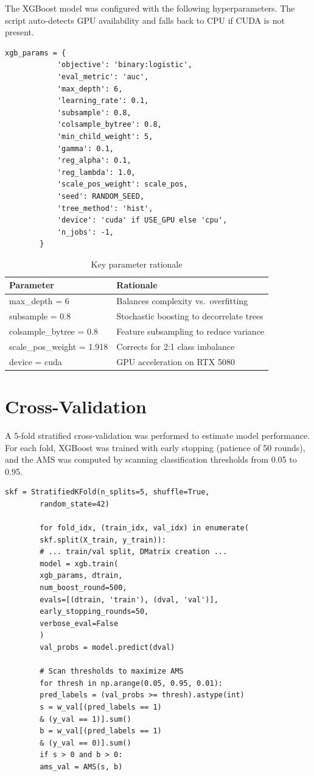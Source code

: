 \documentclass[12pt]{article}
\begin{document}
	The XGBoost model was configured with the following hyperparameters. The script auto-detects GPU availability and falls back to CPU if CUDA is not present.
	
	\begin{lstlisting}[caption={XGBoost hyperparameter configuration with GPU detection}]
		xgb_params = {
			'objective': 'binary:logistic',
			'eval_metric': 'auc',
			'max_depth': 6,
			'learning_rate': 0.1,
			'subsample': 0.8,
			'colsample_bytree': 0.8,
			'min_child_weight': 5,
			'gamma': 0.1,
			'reg_alpha': 0.1,
			'reg_lambda': 1.0,
			'scale_pos_weight': scale_pos,
			'seed': RANDOM_SEED,
			'tree_method': 'hist',
			'device': 'cuda' if USE_GPU else 'cpu',
			'n_jobs': -1,
		}
	\end{lstlisting}
	
	\begin{table}[H]
		\centering
		\begin{tabular}{ll}
			\toprule
			\textbf{Parameter} & \textbf{Rationale} \\
			\midrule
			max\_depth = 6 & Balances complexity vs.\ overfitting \\
			subsample = 0.8 & Stochastic boosting to decorrelate trees \\
			colsample\_bytree = 0.8 & Feature subsampling to reduce variance \\
			scale\_pos\_weight = 1.918 & Corrects for 2:1 class imbalance \\
			device = cuda & GPU acceleration on RTX 5080 \\
			\bottomrule
		\end{tabular}
		\caption{Key parameter rationale}
	\end{table}
	
	\newpage
	\section*{Cross-Validation}
	
	A 5-fold stratified cross-validation was performed to estimate model performance. For each fold, XGBoost was trained with early stopping (patience of 50 rounds), and the AMS was computed by scanning classification thresholds from 0.05 to 0.95.
	
	\begin{lstlisting}[caption={Cross-validation loop with AMS threshold scanning}]
		skf = StratifiedKFold(n_splits=5, shuffle=True, 
		random_state=42)
		
		for fold_idx, (train_idx, val_idx) in enumerate(
		skf.split(X_train, y_train)):
		# ... train/val split, DMatrix creation ...
		model = xgb.train(
		xgb_params, dtrain,
		num_boost_round=500,
		evals=[(dtrain, 'train'), (dval, 'val')],
		early_stopping_rounds=50,
		verbose_eval=False
		)
		val_probs = model.predict(dval)
		
		# Scan thresholds to maximize AMS
		for thresh in np.arange(0.05, 0.95, 0.01):
		pred_labels = (val_probs >= thresh).astype(int)
		s = w_val[(pred_labels == 1) 
		& (y_val == 1)].sum()
		b = w_val[(pred_labels == 1) 
		& (y_val == 0)].sum()
		if s > 0 and b > 0:
		ams_val = AMS(s, b)
	\end{lstlisting}
	
\end{document}
